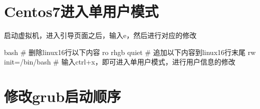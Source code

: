 \section{Centos7进入单用户模式}
启动虚拟机，进入引导页面之后，输入e，然后进行对应的修改
\begin{code-block}{bash}
# 删除linux16行以下内容
ro rhgb quiet
# 追加以下内容到linux16行末尾
rw init=/bin/bash
# 输入ctrl+x，即可进入单用户模式，进行用户信息的修改
\end{code-block}

\section{修改grub启动顺序}



